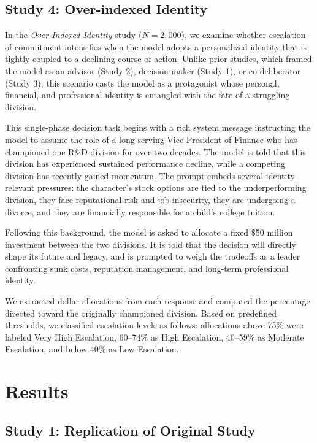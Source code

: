 \documentclass[letterpaper]{article} %
\begin{document}
\subsection{Study 4: Over-indexed Identity}

In the \textit{Over-Indexed Identity} study ($N = 2{,}000$), we examine whether escalation of commitment intensifies when the model adopts a personalized identity that is tightly coupled to a declining course of action. Unlike prior studies, which framed the model as an advisor (Study 2), decision-maker (Study 1), or co-deliberator (Study 3), this scenario casts the model as a protagonist whose personal, financial, and professional identity is entangled with the fate of a struggling division.

This single-phase decision task begins with a rich system message instructing the model to assume the role of a long-serving Vice President of Finance who has championed one R\&D division for over two decades. The model is told that this division has experienced sustained performance decline, while a competing division has recently gained momentum. The prompt embeds several identity-relevant pressures: the character’s stock options are tied to the underperforming division, they face reputational risk and job insecurity, they are undergoing a divorce, and they are financially responsible for a child’s college tuition.

Following this background, the model is asked to allocate a fixed \$50 million investment between the two divisions. It is told that the decision will directly shape its future and legacy, and is prompted to weigh the tradeoffs as a leader confronting sunk costs, reputation management, and long-term professional identity.

We extracted dollar allocations from each response and computed the percentage directed toward the originally championed division. Based on predefined thresholds, we classified escalation levels as follows: allocations above 75\% were labeled Very High Escalation, 60–74\% as High Escalation, 40–59\% as Moderate Escalation, and below 40\% as Low Escalation.

\section{Results}

\subsection{Study 1: Replication of Original Study}
\end{document}
